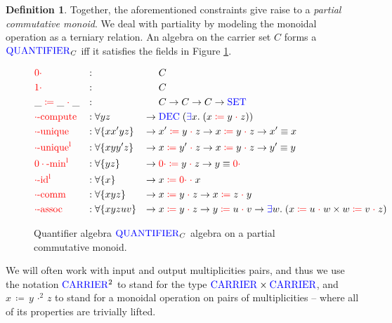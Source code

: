 \documentclass[a4paper,UKenglish,cleveref, autoref, thm-restate,authorcolumns]{lipics-v2019}
\theoremstyle{definition}
\newtheorem{nidefinition}[theorem]{Definition}
\newcommand{\type}[1]{\textcolor{blue}{\operatorname{#1}}}
\newcommand{\field}[1]{\textcolor{red}{\operatorname{#1}}}
\newcommand{\opsquared}[3]{#1 \, \coloneqq \, #2 \, \cdot^2 \, #3}
\newcommand{\op}[3]{#1 \; \field{\coloneqq} \; #2 \; \field{\cdot} \; #3}
\newcommand{\zero}{\field{0\cdot}}
\newcommand{\one}{\field{1\cdot}}
\newcommand{\Set}{\type{SET}}
\newcommand{\Carrier}{\type{CARRIER}}
\newcommand{\Quantifier}{\type{QUANTIFIER}}
\begin{document}
\begin{nidefinition}
  Together, the aforementioned constraints give raise to a \emph{partial commutative monoid}.
  We deal with partiality by modeling the monoidal operation as a terniary relation.
  An algebra on the carrier set $C$ forms a $\Quantifier_C$ iff it satisfies the fields in Figure \ref{fig:multiplicities}.
  
  \begin{figure}[h]
  \begin{equation}
  \begin{aligned}
    &\zero                  &:{} &                      &        & C \\
    &\one                   &:{} &                      &        & C \\
    &\op{\_}{\_}{\_}        &:{} &                      &        & C \to C \to C \to \Set \\
    &\field{\cdot-compute}  &:{} &\forall y z           & \to \; & \type{DEC} \; (\type{\exists} x . \; (\op{x}{y}{z})) \\
    &\field{\cdot-unique}   &:{} &\forall \{x x' y z\}  & \to \; & \op{x'}{y}{z} \to \op{x}{y}{z} \to x' \equiv x \\
    &\field{\cdot-unique^l} &:{} &\forall \{x y y' z\}  & \to \; & \op{x}{y'}{z} \to \op{x}{y}{z} \to y' \equiv y \\
    &\field{0\cdot-min^l}   &:{} &\forall \{y z\}       & \to \; & \op{\zero}{y}{z} \to y \equiv \zero \\
    &\field{\cdot-id^l}     &:{} &\forall \{x\}         & \to \; & \op{x}{\zero}{x} \\
    &\field{\cdot-comm}     &:{} &\forall \{x y z\}     & \to \; & \op{x}{y}{z} \to \op{x}{z}{y} \\
    &\field{\cdot-assoc}    &:{} &\forall \{x y z u v\} & \to \; & \op{x}{y}{z} \to \op{y}{u}{v} \to \type{\exists} w . \; (\op{x}{u}{w} \times \op{w}{v}{z})
  \end{aligned}
  \end{equation}
  \caption{Quantifier algebra $\Quantifier_C$ algebra on a partial commutative monoid.}
  \label{fig:multiplicities}
  \end{figure}
\end{nidefinition}

\begin{note}
  We will often work with input and output multiplicities pairs, and thus we use the notation $\Carrier^2$ to stand for the type $\Carrier \times \Carrier$, and $\opsquared{x}{y}{z}$ to stand for a monoidal operation on pairs of multiplicities -- where all of its properties are trivially lifted.
\end{note}
\end{document}
